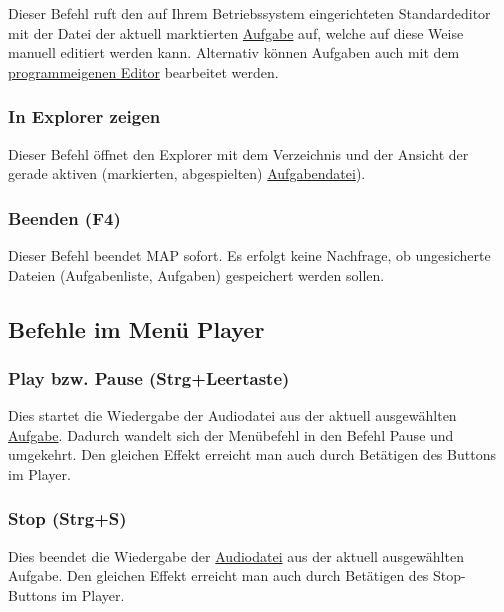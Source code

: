 \documentclass[a4paper,DIV=11
]{scrartcl}
\begin{document}
Dieser Befehl ruft den auf Ihrem Betriebssystem eingerichteten
Standardeditor mit der Datei der aktuell marktierten
\protect\hyperlink{ux5cux23Aufgabendatei}{Aufgabe} auf, welche auf diese
Weise manuell editiert werden kann. Alternativ können Aufgaben auch mit
dem \protect\hyperlink{BefehleImMenuAufgabeneditor}{programmeigenen
Editor} bearbeitet werden.

\hypertarget{in-explorer-zeigen}{%
\subsubsection{In Explorer zeigen}\label{in-explorer-zeigen}}

Dieser Befehl öffnet den Explorer mit dem Verzeichnis und der Ansicht
der gerade aktiven (markierten, abgespielten)
\protect\hyperlink{ux5cux23Aufgabendatei}{Aufgabendatei}).

\hypertarget{beenden-f4}{%
\subsubsection{Beenden (F4)}\label{beenden-f4}}

Dieser Befehl beendet MAP sofort. Es erfolgt keine Nachfrage, ob
ungesicherte Dateien (Aufgabenliste, Aufgaben) gespeichert werden
sollen.

\hypertarget{befehle-im-menuxfc-player}{%
\subsection{Befehle im Menü Player}\label{befehle-im-menuxfc-player}}

\hypertarget{play-bzw-pause-strgleertaste}{%
\subsubsection{Play bzw. Pause
(Strg+Leertaste)}\label{play-bzw-pause-strgleertaste}}

Dies startet die Wiedergabe der Audiodatei aus der aktuell ausgewählten
\protect\hyperlink{aufgabendateien}{Aufgabe}. Dadurch wandelt sich der
Menübefehl in den Befehl Pause und umgekehrt. Den gleichen Effekt
erreicht man auch durch Betätigen des Buttons im Player.

\hypertarget{stop-strgs}{%
\subsubsection{Stop (Strg+S)}\label{stop-strgs}}

Dies beendet die Wiedergabe der
\protect\hyperlink{FormatSounddateien}{Audiodatei} aus der aktuell
ausgewählten Aufgabe. Den gleichen Effekt erreicht man auch durch
Betätigen des Stop-Buttons im Player.
\end{document}
